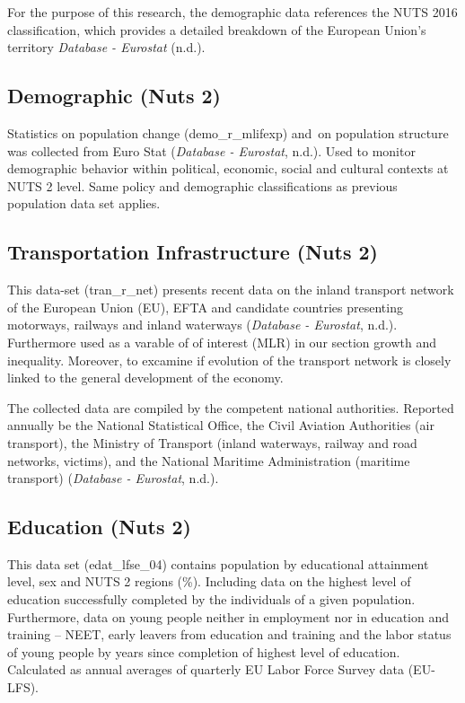 \documentclass[
  a4paper,
  DIV=11,
  numbers=noendperiod]{scrartcl}
\begin{document}
For the purpose of this research, the demographic data references the
NUTS 2016 classification, which provides a detailed breakdown of the
European Union's territory \emph{Database - Eurostat} (n.d.).

\hypertarget{demographic-nuts-2}{%
\subsection{Demographic (Nuts 2)}\label{demographic-nuts-2}}

Statistics on population change (demo\_r\_mlifexp) and~on population
structure was collected from Euro Stat (\emph{Database - Eurostat},
n.d.). Used to monitor demographic behavior within political, economic,
social and cultural contexts at NUTS 2 level. Same policy and
demographic classifications as previous population data set applies.

\hypertarget{transportation-infrastructure-nuts-2}{%
\subsection{Transportation Infrastructure (Nuts
2)}\label{transportation-infrastructure-nuts-2}}

This data-set (tran\_r\_net) presents recent data on the inland
transport network of the European Union (EU), EFTA and candidate
countries presenting motorways, railways and inland waterways
(\emph{Database - Eurostat}, n.d.). Furthermore used as a varable of of
interest (MLR) in our section growth and inequality. Moreover, to
excamine if evolution of the transport network is closely linked to the
general development of the economy.

The collected data are compiled by the competent national authorities.
Reported annually be the National Statistical Office, the Civil Aviation
Authorities (air transport), the Ministry of Transport (inland
waterways, railway and road networks, victims), and the National
Maritime Administration (maritime transport) (\emph{Database -
Eurostat}, n.d.).

\hypertarget{education-nuts-2}{%
\subsection{Education (Nuts 2)}\label{education-nuts-2}}

This data set (edat\_lfse\_04) contains population by educational
attainment level, sex and NUTS 2 regions (\%). Including data on the
highest level of education successfully completed by the individuals of
a given population. Furthermore, data on young people neither in
employment nor in education and training -- NEET, early leavers from
education and training and the labor status of young people by years
since completion of highest level of education. Calculated as annual
averages of quarterly EU Labor Force Survey data (EU-LFS).
\end{document}

